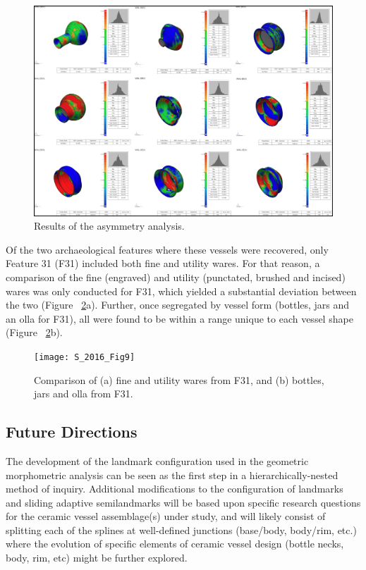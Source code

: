 \documentclass[preprint,12pt]{elsarticle}
\begin{document}
\begin{figure}[ht]\centering
\includegraphics[width=\linewidth]{SS_2015_Figure_5}
\caption{Results of the asymmetry analysis.}
\label{fig:Figure 7}
\end{figure}

Of the two archaeological features where these vessels were recovered, only Feature 31 (F31) included both fine and utility wares. For that reason, a comparison of the fine (engraved) and utility (punctated, brushed and incised) wares was only conducted for F31, which yielded a substantial deviation between the two (Figure ~\ref{fig:Figure 8}a). Further, once segregated by vessel form (bottles, jars and an olla for F31), all were found to be within a range unique to each vessel shape (Figure ~\ref{fig:Figure 8}b). 

\begin{figure}[ht]\centering
\texttt{[image: S\_2016\_Fig9]}
\caption{Comparison of (a) fine and utility wares from F31, and (b) bottles, jars and olla from F31.}
\label{fig:Figure 8}
\end{figure}

\subsection{Future Directions}

The development of the landmark configuration used in the geometric morphometric analysis can be seen as the first step in a hierarchically-nested method of inquiry. Additional modifications to the configuration of landmarks and sliding adaptive semilandmarks will be based upon specific research questions for the ceramic vessel assemblage(s) under study, and will likely consist of splitting each of the splines at well-defined junctions (base/body, body/rim, etc.) where the evolution of specific elements of ceramic vessel design (bottle necks, body, rim, etc) might be further explored. 
\end{document}
